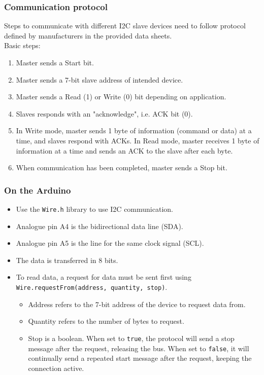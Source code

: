 \documentclass[11pt]{article}
\begin{document}
\subsubsection{Communication protocol}
\label{sec:org9201af0}
Steps to communicate with different I2C slave devices need to follow protocol defined by manufacturers in the provided data sheets.
\\[0pt]

Basic steps:
\begin{enumerate}
\item Master sends a Start bit.
\item Master sends a 7-bit slave address of intended device.
\item Master sends a Read (1) or Write (0) bit depending on application.
\item Slaves responds with an "acknowledge", i.e. ACK bit (0).
\item In Write mode, master sends 1 byte of information (command or data) at a time, and slaves respond with ACKs. In Read mode, master receives 1 byte of information at a time and sends an ACK to the slave after each byte.
\item When communication has been completed, master sends a Stop bit.
\end{enumerate}

\subsubsection{On the Arduino}
\label{sec:org3825d04}
\begin{itemize}
\item Use the \texttt{Wire.h} library to use I2C communication.
\item Analogue pin A4 is the bidirectional data line (SDA).
\item Analogue pin A5 is the line for the same clock signal (SCL).
\item The data is transferred in 8 bits.
\item To read data, a request for data must be sent first using \texttt{Wire.requestFrom(address, quantity, stop)}.
\begin{itemize}
\item Address refers to the 7-bit address of the device to request data from.
\item Quantity refers to the number of bytes to request.
\item Stop is a boolean. When set to \texttt{true}, the protocol will send a stop message after the request, releasing the bus. When set to \texttt{false}, it will continually send a repeated start message after the request, keeping the connection active.
\end{itemize}
\end{itemize}
\end{document}
